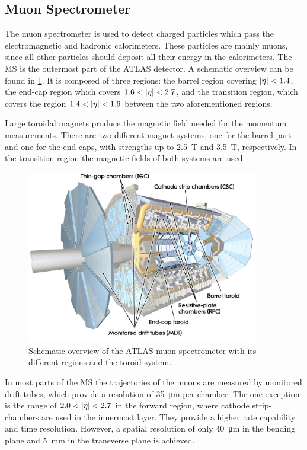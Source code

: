 \subsection{Muon Spectrometer}\label{sub:setup:muons}

The muon spectrometer is used to detect charged particles which pass the electromagnetic and hadronic calorimeters.
These particles are mainly muons, since all other particles should deposit all their energy in the calorimeters.
The MS is the outermost part of the ATLAS detector.
A schematic overview can be found in \cref{fig:setup:muon}.
It is composed of three regions: the barrel region covering $\left|\eta\right| < 1.4$, the end-cap region which covers $1.6 < \left|\eta\right| < 2.7$,
and the transition region, which covers the region $1.4 < \left|\eta\right| < 1.6$ between the two aforementioned regions.

Large toroidal magnets produce the magnetic field needed for the momentum measurements.
There are two different magnet systems, one for the barrel part and one for the end-caps, with strengths up to
\SI{2.5}{\tesla} and \SI{3.5}{\tesla}, respectively.
In the transition region the magnetic fields of both systems are used.

\begin{figure}[htb]
    \centering
    \includegraphics[width=0.9\textwidth]{./figures/setup/muon.jpg}
    \caption{Schematic overview of the ATLAS muon spectrometer with its different regions and the toroid system.~\cite{ImageMuon}}\label{fig:setup:muon}
\end{figure}

In most parts of the MS the trajectories of the muons are measured by monitored drift tubes,  which provide a resolution
of \SI{35}{\um} per chamber.
The one exception is the range of $2.0 < \left|\eta\right| < 2.7$ in the forward region, where cathode strip-chambers are used
in the innermost layer.
They provide a higher rate capability and time resolution.
However, a spatial resolution of only \SI{40}{\um} in the bending plane and \SI{5}{\mm} in the
transverse plane is achieved.

